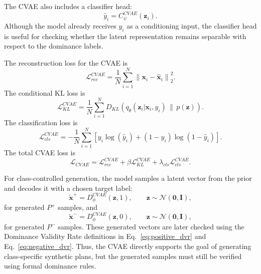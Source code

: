 The CVAE also includes a classifier head:
\begin{equation}
    \hat{y}_i
    =
    C_{\psi}^{CVAE}(\mathbf{z}_i).
    \label{eq:cvae_classifier}
\end{equation}
Although the model already receives $y_i$ as a conditioning input, the classifier head is useful for checking whether the latent representation remains separable with respect to the dominance labels.

The reconstruction loss for the CVAE is
\begin{equation}
    \mathcal{L}_{rec}^{CVAE}
    =
    \frac{1}{N}
    \sum_{i=1}^{N}
    \left\|
        \mathbf{x}_i - \hat{\mathbf{x}}_i
    \right\|_2^2.
    \label{eq:cvae_reconstruction_loss}
\end{equation}
The conditional KL loss is
\begin{equation}
    \mathcal{L}_{KL}^{CVAE}
    =
    \frac{1}{N}
    \sum_{i=1}^{N}
    D_{KL}
    \left(
        q_{\theta}(\mathbf{z}_i|\mathbf{x}_i,y_i)
        \,\|\,
        p(\mathbf{z})
    \right).
    \label{eq:cvae_kl_loss}
\end{equation}
The classification loss is
\begin{equation}
    \mathcal{L}_{cls}^{CVAE}
    =
    -\frac{1}{N}
    \sum_{i=1}^{N}
    \left[
        y_i \log(\hat{y}_i)
        +
        (1-y_i)\log(1-\hat{y}_i)
    \right].
    \label{eq:cvae_classification_loss}
\end{equation}
The total CVAE loss is
\begin{equation}
    \mathcal{L}_{CVAE}
    =
    \mathcal{L}_{rec}^{CVAE}
    +
    \beta \mathcal{L}_{KL}^{CVAE}
    +
    \lambda_{cls}\mathcal{L}_{cls}^{CVAE}.
    \label{eq:cvae_total_loss}
\end{equation}

For class-controlled generation, the model samples a latent vector from the prior and decodes it with a chosen target label:
\begin{equation}
    \tilde{\mathbf{x}}^{+}
    =
    D_{\phi}^{CVAE}(\mathbf{z}, 1),
    \qquad
    \mathbf{z} \sim \mathcal{N}(\mathbf{0},\mathbf{I}),
    \label{eq:cvae_positive_generation}
\end{equation}
for generated $P^{+}$ samples, and
\begin{equation}
    \tilde{\mathbf{x}}^{-}
    =
    D_{\phi}^{CVAE}(\mathbf{z}, 0),
    \qquad
    \mathbf{z} \sim \mathcal{N}(\mathbf{0},\mathbf{I}),
    \label{eq:cvae_negative_generation}
\end{equation}
for generated $P^{-}$ samples. These generated vectors are later checked using the Dominance Validity Rate definitions in Eq.~\eqref{eq:positive_dvr} and Eq.~\eqref{eq:negative_dvr}. Thus, the CVAE directly supports the goal of generating class-specific synthetic plans, but the generated samples must still be verified using formal dominance rules.

